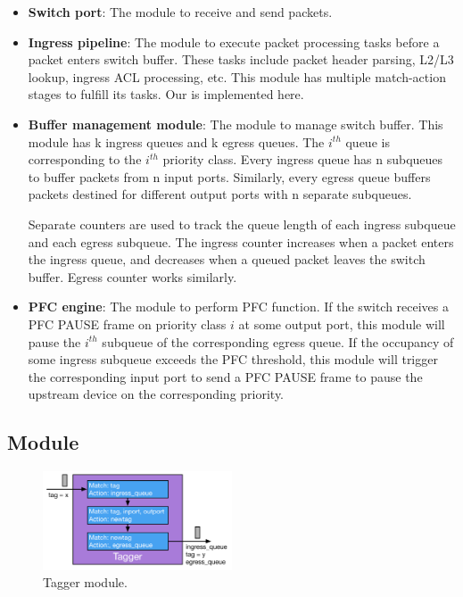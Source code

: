 \begin{itemize}
	\item \textbf{Switch port}: The module to receive and send packets.
	
	\item \textbf{Ingress pipeline}: The module to execute packet processing tasks before a packet enters switch buffer. These tasks include packet header parsing, L2/L3 lookup, ingress ACL processing, etc.  This module has multiple match-action stages to fulfill its tasks. Our \sysname{} is implemented here.
	
	\item \textbf{Buffer management module}: The module to manage switch buffer. This module has k ingress queues and k egress queues. The $i^{th}$ queue is corresponding to the $i^{th}$ priority class. Every ingress queue has n subqueues to buffer packets from n input ports. Similarly, every egress queue buffers packets destined for different output ports with n separate subqueues.
	
	Separate counters are used to track the queue length of each ingress subqueue and each egress subqueue. The ingress counter increases when a packet enters the ingress queue, and decreases when a queued packet leaves the switch buffer. Egress counter works similarly. 
	
	
	\item \textbf{PFC engine}: The module to perform PFC function. If the switch receives a PFC PAUSE frame on priority class $i$ at some output port, this module will pause the $i^{th}$ subqueue of the corresponding egress queue. If the occupancy of some ingress subqueue exceeds the PFC threshold, this module will trigger the corresponding input port to send a PFC PAUSE frame to pause the upstream device on the corresponding priority. 

\end{itemize}


\subsection{\sysname{} Module}\label{subsec:acl}

\begin{figure}
	\hspace{-0.2in}
	\centering
	\includegraphics[width=0.5\textwidth] {figs/Tagger}
	\caption{Tagger module.}\label{fig:tagger}
	
\end{figure}

